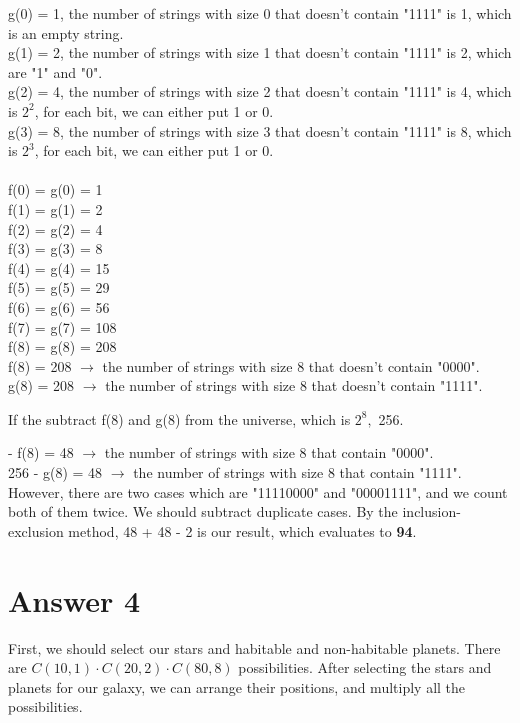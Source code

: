 \documentclass[12pt]{article}
\begin{document}
\noindent g(0) = 1, the number of strings with size 0 that doesn't contain "1111" is 1, which is an empty string. \\
g(1) = 2, the number of strings with size 1 that doesn't contain "1111" is 2, which are "1" and "0". \\
g(2) = 4, the number of strings with size 2 that doesn't contain "1111" is 4, which is $2^2$, for each bit, we can either put 1 or 0. \\
g(3) = 8, the number of strings with size 3 that doesn't contain "1111" is 8, which is $2^3$, for each bit, we can either put 1 or 0.\\\\

\noindent f(0) = g(0) = 1 \\
f(1) = g(1) = 2 \\
f(2) = g(2) = 4 \\
f(3) = g(3) = 8 \\
f(4) = g(4) = 15 \\
f(5) = g(5) = 29 \\
f(6) = g(6) = 56 \\
f(7) = g(7) = 108 \\
f(8) = g(8) = 208 \\

\noindent f(8) = 208 $\rightarrow$ the number of strings with size 8 that doesn't contain "0000".\\
g(8) = 208 $\rightarrow$ the number of strings with size 8 that doesn't contain "1111".

If the subtract f(8) and g(8) from the universe, which is $2^8,$ 256.

 - f(8) = 48 $\rightarrow$ the number of strings with size 8 that contain "0000".\\
256 - g(8) = 48 $\rightarrow$ the number of strings with size 8 that contain "1111".\\

However, there are two cases which are "11110000" and "00001111", and we count both of them twice. We should subtract duplicate cases. By the inclusion-exclusion method, 48 + 48 - 2 is our result, which evaluates to \textbf{94}.

\section*{Answer 4}
First, we should select our stars and habitable and non-habitable planets. There are $C(10,1)\cdot C(20,2)\cdot C(80,8)$ possibilities. After selecting the stars and planets for our galaxy, we can arrange their positions, and multiply all the possibilities. \\\\
\end{document}
